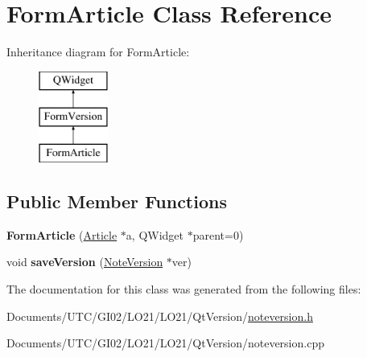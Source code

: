 \hypertarget{class_form_article}{}\section{Form\+Article Class Reference}
\label{class_form_article}
Inheritance diagram for Form\+Article\+:\begin{figure}[H]
\begin{center}
\leavevmode
\includegraphics[height=3.000000cm]{class_form_article}
\end{center}
\end{figure}
\subsection*{Public Member Functions}
\begin{DoxyCompactItemize}
\item 
\mbox{\label{class_form_article_a751d2c68185be1aff70c66121626b1c8}} 
{\bfseries Form\+Article} (\hyperlink{class_article}{Article} $\ast$a, Q\+Widget $\ast$parent=0)
\item 
\mbox{\label{class_form_article_a88488a9f4a72015f6e2bc410e086ebe5}} 
void {\bfseries save\+Version} (\hyperlink{class_note_version}{Note\+Version} $\ast$ver)
\end{DoxyCompactItemize}


The documentation for this class was generated from the following files\+:\begin{DoxyCompactItemize}
\item 
Documents/\+U\+T\+C/\+G\+I02/\+L\+O21/\+L\+O21/\+Qt\+Version/\hyperlink{noteversion_8h}{noteversion.\+h}\item 
Documents/\+U\+T\+C/\+G\+I02/\+L\+O21/\+L\+O21/\+Qt\+Version/noteversion.\+cpp\end{DoxyCompactItemize}
